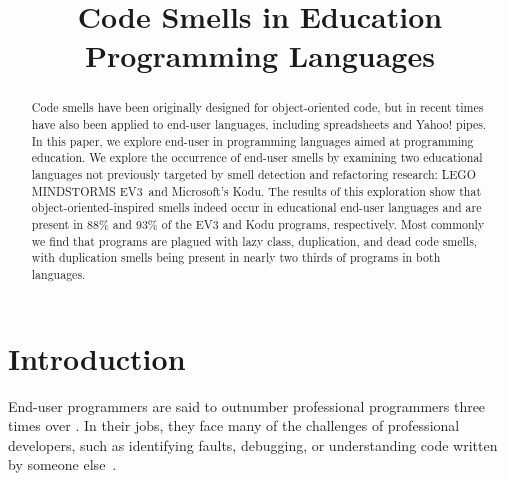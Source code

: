 \documentclass[conference]{IEEEtran}
\newcommand{\ms}{LEGO MINDSTORMS EV3}
\newcommand{\todo}[1]{\textbf{#1}}
\begin{document}
\title{Code Smells in Education Programming Languages} %


\author{
\and
{}
\and
{}
}



\maketitle

\begin{abstract}
Code smells have been originally designed for object-oriented code, but in recent times have also been applied to end-user languages, including spreadsheets and Yahoo! pipes. In this paper, we explore end-user in programming languages aimed at programming education. 
We explore the occurrence of end-user smells by examining two educational languages not previously targeted by smell detection and refactoring research: \ms~and Microsoft's Kodu. The results of this exploration show that object-oriented-inspired smells indeed occur in educational end-user languages and are present in 88\% and 93\% of the EV3 and Kodu programs, respectively. Most commonly we find that programs are plagued with lazy class, duplication, and dead code smells, with duplication smells being present in nearly two thirds of programs in both languages. 
\end{abstract}


\section{Introduction}
End-user programmers are said to outnumber professional programmers three times over \cite{Scaf2005}. In their jobs, they face many of the challenges of professional developers, such as identifying faults, debugging, or understanding code written by someone else~\cite{Ko2011}. 
\end{document}
